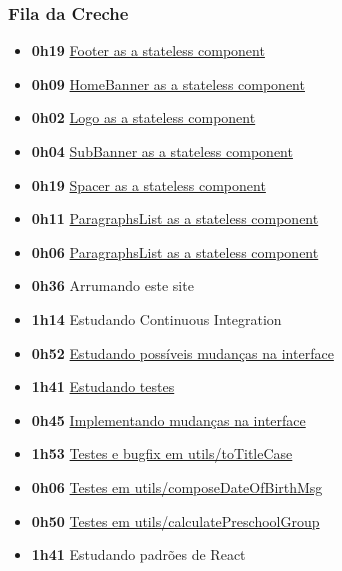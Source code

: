 \hypertarget{fila-da-creche}{%
\subsubsection{Fila da Creche}\label{fila-da-creche}}

\begin{itemize}
\tightlist
\item
  \textbf{0h19}
  \href{https://github.com/prefeiturasp/SME-FilaDaCreche/pull/28}{Footer
  as a stateless component}
\item
  \textbf{0h09}
  \href{https://github.com/prefeiturasp/SME-FilaDaCreche/pull/29}{HomeBanner
  as a stateless component}
\item
  \textbf{0h02}
  \href{https://github.com/prefeiturasp/SME-FilaDaCreche/pull/30}{Logo
  as a stateless component}
\item
  \textbf{0h04}
  \href{https://github.com/prefeiturasp/SME-FilaDaCreche/pull/31}{SubBanner
  as a stateless component}
\item
  \textbf{0h19}
  \href{https://github.com/prefeiturasp/SME-FilaDaCreche/pull/32}{Spacer
  as a stateless component}
\item
  \textbf{0h11}
  \href{https://github.com/prefeiturasp/SME-FilaDaCreche/pull/33}{ParagraphsList
  as a stateless component}
\item
  \textbf{0h06}
  \href{https://github.com/prefeiturasp/SME-FilaDaCreche/pull/33}{ParagraphsList
  as a stateless component}
\item
  \textbf{0h36} Arrumando este site
\item
  \textbf{1h14} Estudando Continuous Integration
\item
  \textbf{0h52}
  \href{https://github.com/prefeiturasp/SME-FilaDaCreche/issues/27}{Estudando
  possíveis mudanças na interface}
\item
  \textbf{1h41}
  \href{https://github.com/prefeiturasp/SME-FilaDaCreche/issues/8\#issuecomment-419673543}{Estudando
  testes}
\item
  \textbf{0h45}
  \href{https://github.com/prefeiturasp/SME-FilaDaCreche/issues/34}{Implementando
  mudanças na interface}
\item
  \textbf{1h53}
  \href{https://github.com/prefeiturasp/SME-FilaDaCreche/pull/40}{Testes
  e bugfix em utils/toTitleCase}
\item
  \textbf{0h06}
  \href{https://github.com/prefeiturasp/SME-FilaDaCreche/pull/41}{Testes
  em utils/composeDateOfBirthMsg}
\item
  \textbf{0h50}
  \href{https://github.com/prefeiturasp/SME-FilaDaCreche/pull/42}{Testes
  em utils/calculatePreschoolGroup}
\item
  \textbf{1h41} Estudando padrões de React
\end{itemize}

